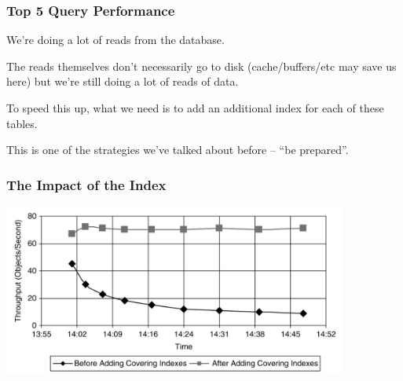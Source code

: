 \begin{frame}
\frametitle{Top 5 Query Performance}

We're doing a lot of reads from the database. 

The reads themselves don't necessarily go to disk (cache/buffers/etc may save us here) but we're still doing a lot of reads of data. 

To speed this up, what we need is to add an additional index for each of these tables. 

This is one of the strategies we've talked about before -- ``be prepared''.


\end{frame}



\begin{frame}
\frametitle{The Impact of the Index}

\begin{center}
	\includegraphics[width=0.85\textwidth]{images/adding-indexes.png}
\end{center}

\end{frame}



